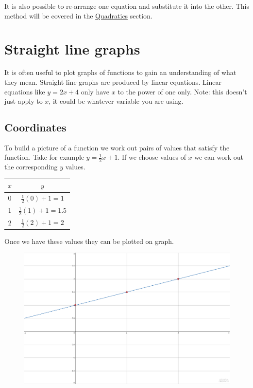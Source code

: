 \documentclass[
  a4paper,
]{scrbook}
\begin{document}
It is also possible to re-arrange one equation and substitute it into
the other. This method will be covered in the
\protect\hyperlink{quadratics-1}{Quadratics} section.


\hypertarget{straight-line-graphs}{%
\chapter{Straight line graphs}\label{straight-line-graphs}}

It is often useful to plot graphs of functions to gain an understanding
of what they mean. Straight line graphs are produced by linear
equations. Linear equations like \(y=2x+4\) only have \(x\) to the power
of one only. Note: this doesn't just apply to \(x\), it could be
whatever variable you are using.

\hypertarget{coordinates}{%
\section{Coordinates}\label{coordinates}}

To build a picture of a function we work out pairs of values that
satisfy the function. Take for example \(y=\frac{1}{2}x+1\). If we
choose values of \(x\) we can work out the corresponding \(y\) values.

\begin{longtable}[]{@{}cc@{}}
\toprule()
\(x\) & \(y\) \\
\midrule()
\endhead
\(0\) & \(\frac{1}{2}(0)+1=1\) \\
\(1\) & \(\frac{1}{2}(1)+1=1.5\) \\
\(2\) & \(\frac{1}{2}(2)+1=2\) \\
\bottomrule()
\end{longtable}

Once we have these values they can be plotted on graph.

\begin{figure}

{\centering 

\href{https://www.desmos.com/calculator/jzyasdusre?embed}{\includegraphics{./06-straight_line_graphs_files/figure-pdf/unnamed-chunk-2-1.png}}

}

\end{figure}
\end{document}

